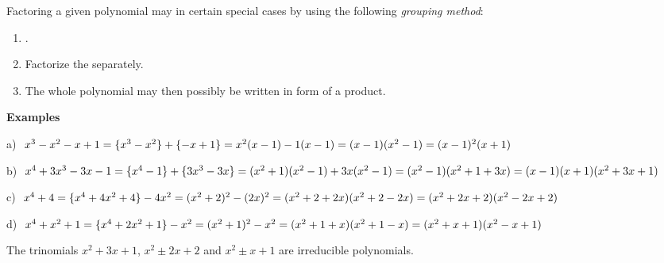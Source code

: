 \documentclass[12pt]{article}
\begin{document}
Factoring a given polynomial may in certain special cases  by using the following {\em grouping method}:
\begin{enumerate}
\item {}.
\item Factorize the  separately.
\item The whole polynomial may then possibly be written in form of a product.
\end{enumerate}

\textbf{Examples}

a) \,\,$x^3-x^2-x+1 = \{x^3-x^2\}+\{-x+1\} = x^2(x-1)-1(x-1) = (x-1)(x^2-1)\\ = (x-1)^2(x+1)$

b) \,\,$x^4+3x^3-3x-1 = \{x^4-1\}+\{3x^3-3x\} = (x^2+1)(x^2-1)+3x(x^2-1)\\ = 
(x^2-1)(x^2+1+3x) = (x-1)(x+1)(x^2+3x+1)$

c) \,\,$x^4+4 = \{x^4+4x^2+4\}-4x^2 = (x^2+2)^2-(2x)^2 = (x^2+2+2x)(x^2+2-2x)\\ = (x^2+2x+2)(x^2-2x+2)$ 

d) \,\,$x^4+x^2+1 = \{x^4+2x^2+1\}-x^2 = (x^2+1)^2-x^2 = (x^2+1+x)(x^2+1-x)\\
= (x^2+x+1)(x^2-x+1)$

The trinomials $x^2\!+\!3x\!+\!1$, $x^2\!\pm\!2x\!+\!2$ and $x^2\!\pm\!x\!+\!1$ are irreducible polynomials.
\end{document}

